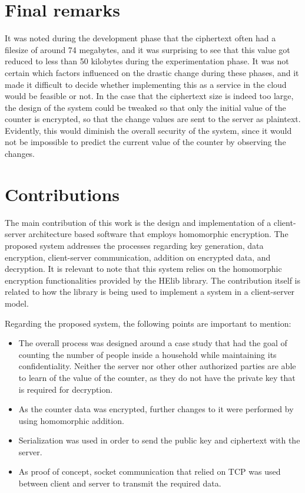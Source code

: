 \section{Final remarks}

It was noted during the development phase that the ciphertext often had a filesize of around 74 megabytes, and it was surprising to see that this value got reduced to less than 50 kilobytes during the experimentation phase. It was not certain which factors  influenced on the drastic change during these phases, and it made it difficult to decide whether implementing this as a service in the cloud would be feasible or not. In the case that the ciphertext size is indeed too large, the design of the system could be tweaked so that only the initial value of the counter is encrypted, so that the change values are sent to the server as plaintext. Evidently, this would diminish the overall security of the system, since it would not be impossible to predict the current value of the counter by observing the changes. 

\section{Contributions}

The main contribution of this work is the design and implementation of a client-server architecture based software that employs homomorphic encryption. The proposed system addresses the processes regarding key generation, data encryption, client-server communication, addition on encrypted data, and decryption. It is relevant to note that this system relies on the homomorphic encryption functionalities provided by the HElib library. The contribution itself is related to how the library is being used to implement a system in a client-server model.

Regarding the proposed system, the following points are important to mention:

\begin{itemize}
\item The overall process was designed around a case study that had the goal of counting the number of people inside a household while maintaining its confidentiality. Neither the server nor other other authorized parties are able to learn of the value of the counter, as they do not have the private key that is required for decryption.
\item As the counter data was encrypted, further changes to it were performed by using homomorphic addition. 
\item Serialization was used in order to send the public key and ciphertext with the server.
\item As proof of concept, socket communication that relied on TCP was used between client and server to transmit the required data.
\end{itemize} 

